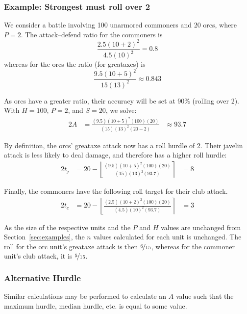 \documentclass[twocolumn]{article}
\begin{document}
\subsubsection{Example: Strongest must roll over 2}

We consider a battle involving 100 unarmored commoners and 20 orcs,
where $P = 2$.
The attack--defend ratio for the commoners is
\[
    \frac
        {2.5 (10 + 2)^2}
        {4.5 (10)^2}
    =
    0.8
\]
whereas for the orcs the ratio (for greataxes) is
\[
    \frac
        {9.5 (10 + 5)^2}
        {15 (13)^2}
    \approx
    0.843
\]

As orcs have a greater ratio, their accuracy will be set at 90\% (rolling over 2).
With $H = 100$, $P = 2$, and $S = 20$,
we solve:
\begin{alignat*}{2}
    A &= 
        \frac
            {(9.5) (10 + 5)^2 (100) (20)}
            {(15) (13)^2 (20 - 2)}
        &{}\approx 93.7
\end{alignat*}

By definition, the orcs' greataxe attack now has a roll hurdle of 2.
Their javelin attack is less likely to deal damage,
and therefore has a higher roll hurdle:
\begin{alignat*}{2}
    t_j &=
        20 -
        \left\lfloor
            \frac
                {(9.5) (10 + 5)^2 (100) (20)}
                {(15) (13)^2 (93.7)}
        \right\rceil
            &= 8
\end{alignat*}

Finally, the commoners have the following roll target
for their club attack.
\begin{alignat*}{2}
    t_c &=
        20 -
        \left\lfloor
            \frac
                {(2.5) (10 + 2)^2 (100) (20)}
                {(4.5) (10)^2 (93.7)}
        \right\rceil
            &= 3
\end{alignat*}

As the size of the respective units and the $P$ and $H$ values
are unchanged from Section~\ref{sec:examples},
the $n$ values calculated for each unit is unchanged.
The roll for the orc unit's greataxe attack is then $\nicefrac{6}{15}$,
whereas for the commoner unit's club attack, it is $\nicefrac{5}{15}$.

\subsubsection{Alternative Hurdle}

Similar calculations may be performed to calculate an $A$ value
such that the maximum hurdle, median hurdle, etc.
is equal to some value.
\end{document}
